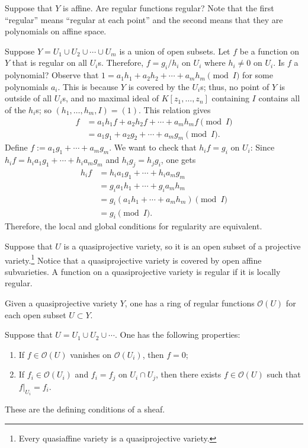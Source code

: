 \documentclass [11 pt, oneside] {article}
\begin{document}
\begin{problem}
	Suppose that $Y$ is affine. Are regular functions regular? Note that the first ``regular'' means ``regular at each point'' and the second means that they are polynomials on affine space.
\end{problem}

Suppose $Y=U_1\cup U_2\cup \cdots \cup U_m$ is a union of open subsets. Let $f$ be a function on $Y$ that is regular on all $U_i$s. Therefore, $f=g_i/h_i$ on $U_i$ where $h_i\ne 0 $ on $U_i$. Is $f$ a polynomial? Observe that $1= a_1h_1 + a_2h_2 + \cdots +a_mh_m\pmod I$ for some polynomials $a_i$. This is because $Y$ is covered by the $U_i$s; thus, no point of $Y$ is outside of all $U_i$s, and no maximal ideal of $K[z_1,\hdots,z_n]$ containing $I$ contains all of the $h_i$s; so $(h_1,\hdots, h_m, I)=(1)$. This relation gives
\begin{align*}
	f &= a_1h_1f + a_2h_2f + \cdots + a_mh_mf \pmod I\\
	  &= a_1g_1 + a_2g_2+\cdots + a_mg_m \pmod I.
\end{align*}
Define $f:= a_1g_1+\cdots + a_mg_m$. We want to check that $h_if = g_i$ on $U_i$: Since $h_if = h_ia_1g_1 +\cdots + h_ia_mg_m$ and $h_ig_j = h_jg_i$, one gets
\begin{align*}
	h_if &= h_ia_1g_1 +\cdots + h_ia_mg_m\\
	     &= g_ia_1h_1 + \cdots + g_ia_mh_m\\
	     &= g_i(a_1h_1+\cdots+a_mh_m)\pmod I\\
	     &= g_i \pmod I.
\end{align*}
Therefore, the local and global conditions for regularity are equivalent.

Suppose that $U$ is a quasiprojective variety, so it is an open subset of a projective variety.\footnote{Every quasiaffine variety is a quasiprojective variety.} Notice that a quasiprojective variety is covered by open affine subvarieties. A function on a quasiprojective variety is  regular if it is locally regular.

Given a quasiprojective variety $Y$, one has a ring of regular functions $\mathscr{O}(U)$ for each open subset $U\subset Y$. 

Suppose that $U= U_1\cup U_2\cup \cdots$. One has the following properties:
\begin{enumerate}
	\item If $f\in \mathscr{O}(U) $ vanishes on $\mathscr{O}(U_i) $, then $f = 0$;
	\item If $f_i\in \mathscr{O}(U_i) $ and $f_i = f_j$ on $U_i\cap U_j$, then there exists $f\in \mathscr{O}(U) $ such that $f \big |_{U_i} = f_i$.
\end{enumerate}
These are the defining conditions of a sheaf.
\end{document}
